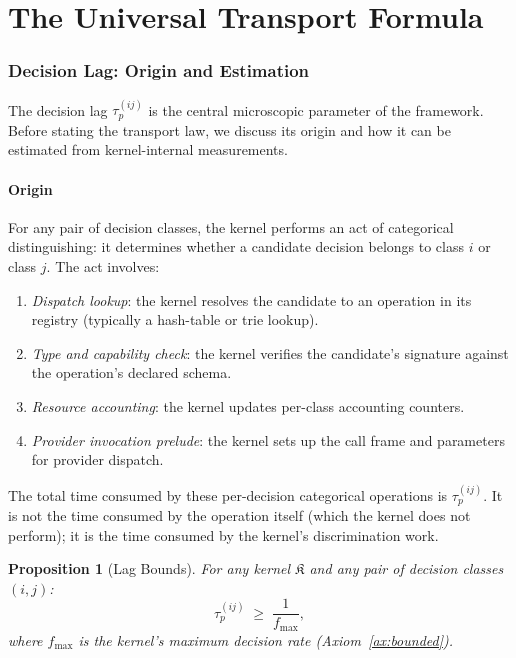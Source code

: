 \documentclass[twocolumn,11pt,a4paper]{article}
\newtheorem{proposition}[theorem]{Proposition}
\newcommand{\taup}{\tau_p}
\newcommand{\Kernel}{\mathfrak{K}}
\begin{document}
\part{The Universal Transport Formula}

\section{Decision Lag: Origin and Estimation}
\label{sec:lag}

The decision lag $\taup^{(ij)}$ is the central microscopic parameter of the framework. Before stating the transport law, we discuss its origin and how it can be estimated from kernel-internal measurements.

\subsection{Origin}

For any pair of decision classes, the kernel performs an act of categorical distinguishing: it determines whether a candidate decision belongs to class $i$ or class $j$. The act involves:

\begin{enumerate}[nosep, leftmargin=*]
\item \emph{Dispatch lookup}: the kernel resolves the candidate to an operation in its registry (typically a hash-table or trie lookup).
\item \emph{Type and capability check}: the kernel verifies the candidate's signature against the operation's declared schema.
\item \emph{Resource accounting}: the kernel updates per-class accounting counters.
\item \emph{Provider invocation prelude}: the kernel sets up the call frame and parameters for provider dispatch.
\end{enumerate}

The total time consumed by these per-decision categorical operations is $\taup^{(ij)}$. It is not the time consumed by the operation itself (which the kernel does not perform); it is the time consumed by the kernel's discrimination work.

\begin{proposition}[Lag Bounds]
\label{prop:lag-bounds}
For any kernel $\Kernel$ and any pair of decision classes $(i, j)$:
\[
\taup^{(ij)} \;\geq\; \frac{1}{f_\mathrm{max}},
\]
where $f_\mathrm{max}$ is the kernel's maximum decision rate (Axiom~\ref{ax:bounded}).
\end{proposition}
\end{document}
